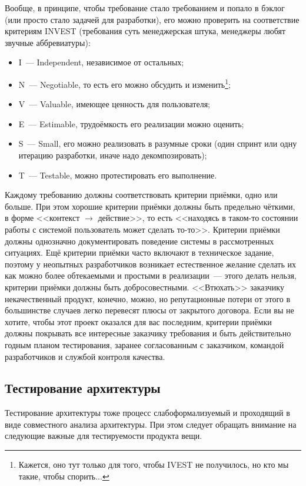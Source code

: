 \documentclass{../../text-style}
\begin{document}
Вообще, в принципе, чтобы требование стало требованием и попало в бэклог (или просто стало задачей для разработки), его можно проверить на соответствие критериям INVEST (требования суть менеджерская штука, менеджеры любят звучные аббревиатуры):

\begin{itemize}
    \item I~--- Independent, независимое от остальных;
    \item N~--- Negotiable, то есть его можно обсудить и изменить\footnote{Кажется, оно тут только для того, чтобы IVEST не получилось, но кто мы такие, чтобы спорить...};
    \item V~--- Valuable, имеющее ценность для пользователя;
    \item E~--- Estimable, трудоёмкость его реализации можно оценить;
    \item S~--- Small, его можно реализовать в разумные сроки (один спринт или одну итерацию разработки, иначе надо декомпозировать);
    \item T~--- Testable, можно протестировать его выполнение.
\end{itemize}

Каждому требованию должны соответствовать критерии приёмки, одно или больше. При этом хорошие критерии приёмки должны быть предельно чёткими, в форме <<контекст $\to$ действие>>, то есть <<находясь в таком-то состоянии работы с системой пользователь может сделать то-то>>. Критерии приёмки должны однозначно документировать поведение системы в рассмотренных ситуациях. Ещё критерии приёмки часто включают в техническое задание, поэтому у неопытных разработчиков возникает естественное желание сделать их как можно более обтекаемыми и простыми в реализации~--- этого делать нельзя, критерии приёмки должны быть добросовестными. <<Втюхать>> заказчику некачественный продукт, конечно, можно, но репутационные потери от этого в большинстве случаев легко перевесят плюсы от закрытого договора. Если вы не хотите, чтобы этот проект оказался для вас последним, критерии приёмки должны покрывать все интересные заказчику требования и быть действительно годным планом тестирования, заранее согласованным с заказчиком, командой разработчиков и службой контроля качества.

\subsection{Тестирование архитектуры}

Тестирование архитектуры тоже процесс слабоформализуемый и проходящий в виде совместного анализа архитектуры. При этом следует обращать внимание на следующие важные для тестируемости продукта вещи.
\end{document}
